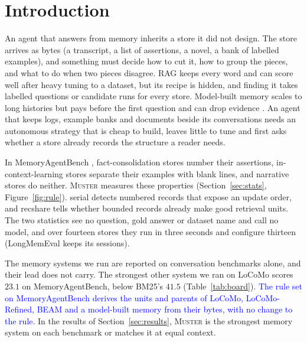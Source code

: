\documentclass{article}
\newcommand{\nativechange}[1]{\textcolor{blue}{#1}}
\newcommand{\sys}{\textsc{Muster}}
\newcommand{\serial}{\textsf{serial}}
\newcommand{\cov}{\textsf{recshare}}
\begin{document}
\section{Introduction}

An agent that answers from memory inherits a store it did not design. The store arrives as bytes (a
transcript, a list of assertions, a novel, a bank of labelled examples), and something must decide how to cut
it, how to group the pieces, and what to do when two pieces disagree. RAG keeps every word and can score well after heavy tuning to a dataset, but its recipe is hidden, and finding it takes labelled questions or candidate runs for every store. Model-built memory scales to long histories but pays before the first question and can drop evidence \cite{fidelity}. An agent that keeps logs, example banks and documents beside its conversations needs an autonomous strategy that is cheap to build, leaves little to tune and first asks whether a store already records the structure a reader needs.

In MemoryAgentBench \cite{mab}, fact-consolidation stores number their assertions,
in-context-learning stores separate their examples with blank lines, and narrative stores do neither. \sys{}
measures these properties (Section~\ref{sec:stats}, Figure~\ref{fig:rule}). \serial{} detects numbered records that
expose an update order, and \cov{} tells whether bounded records already make good retrieval units. The
two statistics see no question, gold answer or dataset name and call no model, and over fourteen stores they run
in three seconds and configure thirteen (LongMemEval keeps its sessions).

The memory systems we run are reported on conversation benchmarks alone, and their lead does not carry. The strongest other system we ran on LoCoMo scores $23.1$ on MemoryAgentBench, below BM25's $41.5$ (Table~\ref{tab:board}). \nativechange{The rule set on MemoryAgentBench derives the units and parents of LoCoMo, LoCoMo-Refined, BEAM and a model-built memory from their bytes, with no change to the rule.} In the results of Section~\ref{sec:results}, \sys{} is the strongest memory system on each benchmark or matches it at equal context.
\end{document}
